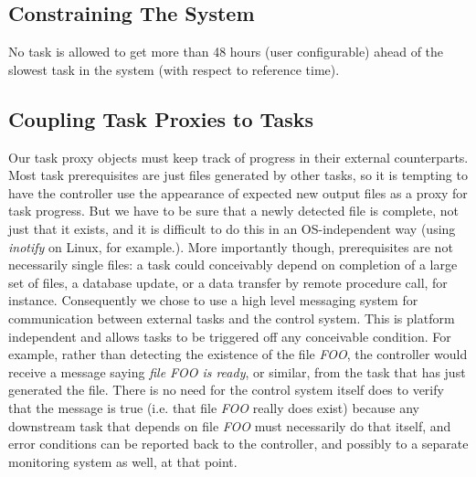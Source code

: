 \subsection{Constraining The System}

No task is allowed to get more than 48 hours (user configurable) ahead
of the slowest task in the system (with respect to reference time).


\subsection{Coupling Task Proxies to Tasks} 

Our task proxy objects must keep track of progress in their external
counterparts. Most task prerequisites are just files generated by other
tasks, so it is tempting to have the controller use the appearance of
expected new output files as a proxy for task progress. But we have to
be sure that a newly detected file is complete, not just that it exists,
and it is difficult to do this in an OS-independent way (using {\em
inotify} on Linux, for example.). 
More importantly though, prerequisites are not necessarily single files:
a task could conceivably depend on completion of a large set of files, a
database update, or a data transfer by remote procedure call, for
instance. Consequently we chose to use a high level messaging system for
communication between external tasks and the control system. This is
platform independent and allows tasks to be triggered off any
conceivable condition. For example, rather than detecting the existence
of the file {\em FOO}, the controller would receive a message saying
{\em file FOO is ready}, or similar, from the task that has
just generated the file.  There is no need for the control system itself
does to verify that the message is true (i.e. that file {\em FOO}
really does exist) because any downstream task that
depends on file {\em FOO} must necessarily do that itself, and error 
conditions can be reported back to the controller, and possibly to a
separate monitoring system as well, at that point.

